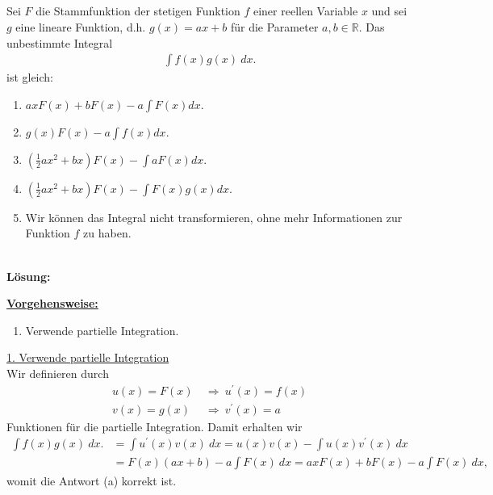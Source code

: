 \subsection*{}
Sei $ F $ die Stammfunktion der stetigen Funktion $ f $ einer reellen Variable $ x $ und sei $ g $ eine lineare Funktion, d.h. $ g(x) = ax +b $ für die Parameter $ a,b \in \mathbb{R} $. Das unbestimmte Integral
\begin{align*}
	\int f(x) g(x) \ dx.
\end{align*}
ist gleich:
\renewcommand{\labelenumi}{(\alph{enumi})}
\begin{enumerate}
	\item 
	$ a x F(x) + b F(x) - a \int F(x) dx$.
	\item 
	$ g(x) F(x) - a \int f(x) dx$.
	\item 
	$ \left(\frac{1}{2} a x^2 +b x\right) F(x) - \int a F(x) dx$.
	\item
	$ \left(\frac{1}{2} a x^2 +b x\right) F(x) - \int  F(x) g(x) dx$.
	\item 
	Wir können das Integral nicht transformieren, ohne mehr Informationen zur Funktion $ f $ zu haben.
\end{enumerate}
\ \\
\textbf{Lösung:}
\begin{mdframed}
\underline{\textbf{Vorgehensweise:}}
\renewcommand{\labelenumi}{\theenumi.}
\begin{enumerate}
\item Verwende partielle Integration.
\end{enumerate}
\end{mdframed}

\underline{1. Verwende partielle Integration}\\
Wir definieren durch
\begin{align*}
	u(x)  = F(x)  \ &\Rightarrow \ u^\prime(x) = f(x)\\
	v(x) = g(x)  \ &\Rightarrow \ v^\prime (x) = a	
\end{align*}
Funktionen für die partielle Integration. Damit erhalten wir
\begin{align*}
	\int f(x) g(x) \ dx.
	&=
	\int u^\prime(x) v(x) \ dx
	=
	u(x) v(x) - \int u(x) v^\prime(x) \ dx\\
	&=
	F(x)(ax+b) - a \int F(x) \ dx
	=
	axF(x) + b F(x) - a \int F(x) \ dx,
\end{align*}
womit die Antwort (a) korrekt ist.

\newpage

